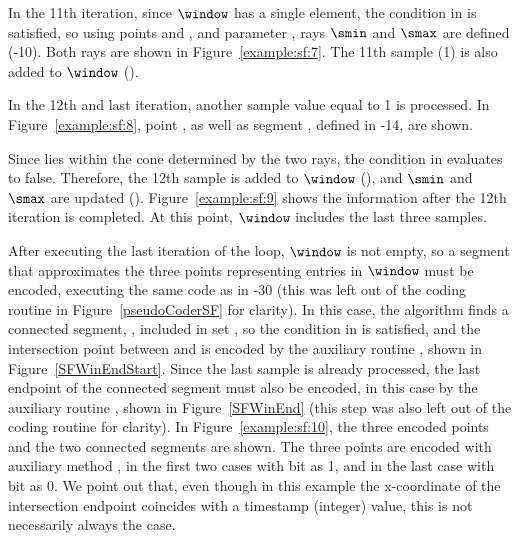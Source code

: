 

\clearpage


In the 11th iteration, since $\window$ has a single element, the condition in  is satisfied, so using points \snapshot and , and parameter \maxerror, rays $\smin$ and $\smax$ are defined (-10). Both rays are shown in Figure~\ref{example:sf:7}. The 11th sample (1) is also added to $\window$ (). 




In the 12th and last iteration, another sample value equal to 1 is processed. In Figure~\ref{example:sf:8}, point , as well as segment , defined in -14, are shown.




\clearpage


\vspace{-5pt}
Since  lies within the cone determined by the two rays, the condition in  evaluates to false. Therefore, the 12th sample is added to $\window$ (), and $\smin$ and $\smax$ are updated (). Figure~\ref{example:sf:9}  shows the information after the 12th iteration is completed. At this point, $\window$ includes the last three samples.


\vspace{-11.5pt}


\vspace{-16pt}
After executing the last iteration of the loop, $\window$ is not empty, so a segment that approximates the three points representing entries in $\window$ must be encoded, executing the same code as in -30 (this was left out of the coding routine in Figure~\ref{pseudoCoderSF} for clarity). In this case, the algorithm finds a connected segment, \segmentConnT, included in set \segmentSet, so the condition in  is satisfied, and the intersection point between \segmentLastT and \segmentConnT is encoded by the auxiliary routine \SFEncodeWinEndStart, shown in Figure~\ref{SFWinEndStart}. Since the last sample is already processed, the last endpoint of the connected segment must also be encoded, in this case by the auxiliary routine \CAWinEnd, shown in Figure~\ref{SFWinEnd} (this step was also left out of the coding routine for clarity). In Figure~\ref{example:sf:10}, the three encoded points and the two connected segments are shown. The three points are encoded with auxiliary method \SFEncodePoint, in the first two cases with bit \connectedS as 1, and in the last case with bit \connectedS as 0. We point out that, even though in this example the x-coordinate of the intersection endpoint coincides with a timestamp (integer) value, this is not necessarily always the case.


